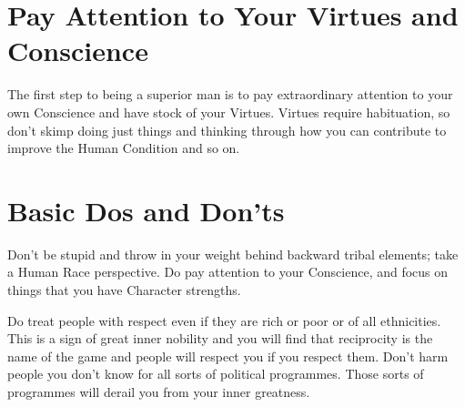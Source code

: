 \documentclass{amsart}
\begin{document}
\section{Pay Attention to Your Virtues and Conscience}

The first step to being a superior man is to pay extraordinary attention to your own Conscience and have stock of your Virtues.  Virtues require habituation, so don't skimp doing just things and thinking through how you can contribute to improve the Human Condition and so on.  

\section{Basic Dos and Don'ts}

Don't be stupid and throw in your weight behind backward tribal elements; take a Human Race perspective.  Do pay attention to your Conscience, and focus on things that you have Character strengths.

Do treat people with respect even if they are rich or poor or of all ethnicities.  This is a sign of great inner nobility and you will find that reciprocity is the name of the game and people will respect you if you respect them.  Don't harm people you don't know for all sorts of political programmes.  Those sorts of programmes will derail you from your inner greatness.  
 
\end{document}
